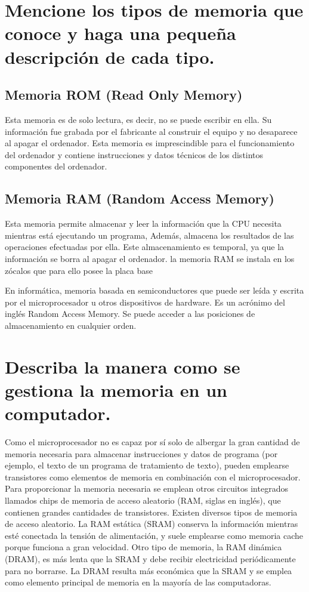 \documentclass{article}
\begin{document}
\section{Mencione los tipos de memoria que conoce y haga una pequeña descripción de cada tipo.}
\subsection{Memoria ROM (Read Only Memory)}
Esta memoria es de solo lectura, es decir, no se puede escribir en ella. Su información fue grabada por el fabricante al construir el equipo y no desaparece al apagar el ordenador. Esta memoria es imprescindible para el funcionamiento del ordenador y contiene instrucciones y datos técnicos de los distintos componentes del ordenador.

\subsection{Memoria RAM (Random Access Memory)}
Esta memoria permite almacenar y leer la información que la CPU necesita mientras está ejecutando un programa, Además, almacena los resultados de las operaciones efectuadas por ella. Este almacenamiento es temporal, ya que la información se borra al apagar el ordenador. la memoria RAM se instala en los zócalos que para ello posee la placa base

En informática, memoria basada en semiconductores que puede ser leída y escrita por el microprocesador u otros dispositivos de hardware. Es un acrónimo del inglés Random Access Memory. Se puede acceder a las posiciones de almacenamiento en cualquier orden.

\section{Describa la manera como se gestiona la memoria en un computador.}

Como el microprocesador no es capaz por sí solo de albergar la gran cantidad de memoria necesaria para almacenar instrucciones y datos de programa (por ejemplo, el texto de un programa de tratamiento de texto), pueden emplearse transistores como elementos de memoria en combinación con el microprocesador. Para proporcionar la memoria necesaria se emplean otros circuitos integrados llamados chips de memoria de acceso aleatorio (RAM, siglas en inglés), que contienen grandes cantidades de transistores. Existen diversos tipos de memoria de acceso aleatorio. La RAM estática (SRAM) conserva la información mientras esté conectada la tensión de alimentación, y suele emplearse como memoria cache porque funciona a gran velocidad. Otro tipo de memoria, la RAM dinámica (DRAM), es más lenta que la SRAM y debe recibir electricidad periódicamente para no borrarse. La DRAM resulta más económica que la SRAM y se emplea como elemento principal de memoria en la mayoría de las computadoras.
\end{document}
